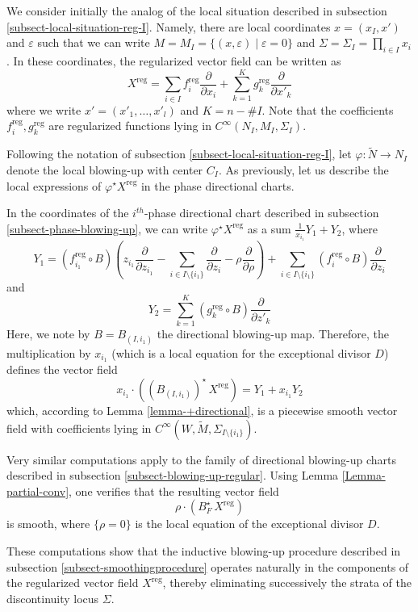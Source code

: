 \documentclass[11pt,psamsfonts]{article}
\theoremstyle{definition}
\theoremstyle{remark}
\newcommand{\eps}{\varepsilon }
\newcommand{\reg}{\mathrm{reg}}
\begin{document}
We consider initially the analog of the local situation described in subsection \ref{subsect-local-situation-reg-I}. 
Namely, there are local coordinates $x = (x_I,x')$ and $\eps$ such that we can write $M= M_I =\{(x,\eps) \mid \eps = 0\}$ and $\Sigma=\Sigma_I = \prod_{i\in I} x_i$. 
In these coordinates, the regularized vector field can be written as 
$$
X^\reg = \sum_{i\in I} f_i^{\reg} \frac{\partial}{\partial x_i} + \sum_{k=1}^{K} g_{k}^\reg \frac{\partial}{\partial x'_k} 
$$
where we write $x' = (x'_1,\ldots,x'_l)$ and $K = n-\# I$.  Note that the coefficients $f_i^\reg,g_k^\reg$ are regularized functions lying in $C^{\infty}(N_I,M_I,
\Sigma_I)$.

Following the notation of subsection \ref{subsect-local-situation-reg-I}, let $\varphi:\tilde N \rightarrow N_I$ denote the local blowing-up with center $C_I$. 
As previously, let us describe  the local expressions of $\varphi^\star X^\reg$ in the phase directional charts.

In the coordinates of the $i^{th}$-phase directional chart described in subsection \ref{subsect-phase-blowing-up}, we can write $\varphi^\star X^\reg$ as a sum
$\frac{1}{x_{i_1}} Y_1 + Y_2$, where 
$$
Y_1 = (f_{i_1}^{\reg} \circ B) \left( 
z_{i_1} \frac{\partial}{\partial z_{i_1}} 
- \sum_{i \in I \setminus \{ i_1 \}} \frac{\partial}{\partial z_i} - \rho \frac{\partial}{\partial \rho}
\right)
+ \sum_{i \in I \setminus \{ i_1 \}} (f_i^{\reg} \circ B) \frac{\partial}{\partial z_i}
$$
and 
$$
Y_2 = \sum_{k=1}^{K} (g_{k}^\reg \circ B) \frac{\partial}{\partial z'_k} 
$$
Here, we note by $B = B_{(I,i_1)}$ the directional blowing-up map. Therefore, the multiplication by $x_{i_1}$ (which is a local equation for the exceptional divisor $D$) defines the vector field
$$
x_{i_1}\cdot ((B_{(I,i_1)})^\star\, X^\reg) = Y_1 + x_{i_1} Y_2
$$
 which, according to Lemma \ref{lemma-+directional}, is a piecewise smooth vector field with coefficients lying in $C^{\infty} (W, \tilde{M},\Sigma_{I \setminus \{ i_1 \}})$. 
 
Very similar computations apply to the family of directional blowing-up charts described in subsection \ref{subsect-blowing-up-regular}. Using Lemma \ref{Lemma-partial-conv}, one verifies that the resulting vector field
$$
\rho\cdot  (B_F^\star\, X^\reg)
$$
is smooth, where $\{\rho = 0\}$ is the local equation of the exceptional divisor $D$. 

These computations show that the inductive blowing-up procedure described in subsection \ref{subsect-smoothingprocedure} operates naturally in the components of the regularized vector field $X^\reg$, thereby eliminating successively the strata of the discontinuity locus $\Sigma$.
\end{document}
